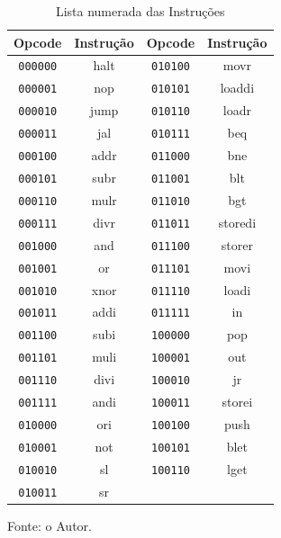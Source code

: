 \documentclass[
	12pt,				%
	oneside,
	a4paper,			%
	english,			%
	french,				%
	spanish,			%
	brazil,				%
	]{abntex2}
\begin{document}
\setlength{\tabcolsep}{10pt} %
\begin{table}[H]
\centering
\caption{Lista numerada das Instruções}
\label{opcode_lista_bin_zero}
\begin{tabular}{|c c|c c|}
\hline
Opcode & Instrução & Opcode & Instrução \\
\hline
\texttt{000000} & halt      & \texttt{010100} & movr     \\
\texttt{000001} & nop       & \texttt{010101} & loaddi   \\
\texttt{000010} & jump      & \texttt{010110} & loadr    \\
\texttt{000011} & jal       & \texttt{010111} & beq      \\
\texttt{000100} & addr      & \texttt{011000} & bne      \\
\texttt{000101} & subr      & \texttt{011001} & blt      \\
\texttt{000110} & mulr      & \texttt{011010} & bgt      \\
\texttt{000111} & divr      & \texttt{011011} & storedi  \\
\texttt{001000} & and       & \texttt{011100} & storer   \\
\texttt{001001} & or        & \texttt{011101} & movi     \\
\texttt{001010} & xnor      & \texttt{011110} & loadi    \\
\texttt{001011} & addi      & \texttt{011111} & in       \\
\texttt{001100} & subi      & \texttt{100000} & pop      \\
\texttt{001101} & muli      & \texttt{100001} & out      \\
\texttt{001110} & divi      & \texttt{100010} & jr       \\
\texttt{001111} & andi      & \texttt{100011} & storei   \\
\texttt{010000} & ori       & \texttt{100100} & push     \\
\texttt{010001} & not       & \texttt{100101} & blet     \\
\texttt{010010} & sl        & \texttt{100110} & lget     \\
\texttt{010011} & sr        &                  &          \\
\hline
\end{tabular}
\vspace{-0.5em}
\begin{center}
Fonte: o Autor.
\end{center}
\end{table}
\end{document}
